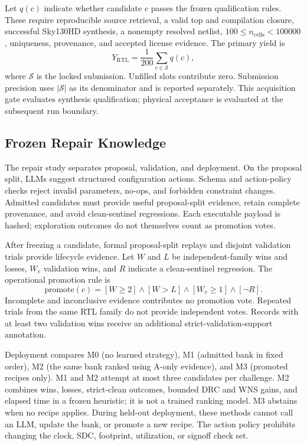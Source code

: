 Let $q(c)$ indicate whether candidate $c$ passes the frozen qualification rules. These require reproducible source retrieval, a valid top and compilation closure, successful Sky130HD synthesis, a nonempty resolved netlist, $100\leq n_{\mathrm{cells}}<100000$, uniqueness, provenance, and accepted license evidence. The primary yield is
\begin{equation}
Y_{\mathrm{RTL}}=\frac{1}{200}\sum_{c\in\mathcal{S}}q(c),
\end{equation}
where $\mathcal{S}$ is the locked submission. Unfilled slots contribute zero. Submission precision uses $|\mathcal{S}|$ as its denominator and is reported separately. This acquisition gate evaluates synthesis qualification; physical acceptance is evaluated at the subsequent run boundary.

\subsection{Frozen Repair Knowledge}
The repair study separates proposal, validation, and deployment. On the proposal split, LLMs suggest structured configuration actions. Schema and action-policy checks reject invalid parameters, no-ops, and forbidden constraint changes. Admitted candidates must provide useful proposal-split evidence, retain complete provenance, and avoid clean-sentinel regressions. Each executable payload is hashed; exploration outcomes do not themselves count as promotion votes.

After freezing a candidate, formal proposal-split replays and disjoint validation trials provide lifecycle evidence. Let $W$ and $L$ be independent-family wins and losses, $W_v$ validation wins, and $R$ indicate a clean-sentinel regression. The operational promotion rule is
\begin{equation}
\mathrm{promote}(c)=[W\geq2]\land[W>L]\land[W_v\geq1]\land[\neg R].
\end{equation}
Incomplete and inconclusive evidence contributes no promotion vote. Repeated trials from the same RTL family do not provide independent votes. Records with at least two validation wins receive an additional strict-validation-support annotation.

Deployment compares M0 (no learned strategy), M1 (admitted bank in fixed order), M2 (the same bank ranked using A-only evidence), and M3 (promoted recipes only). M1 and M2 attempt at most three candidates per challenge. M2 combines wins, losses, strict-clean outcomes, bounded DRC and WNS gains, and elapsed time in a frozen heuristic; it is not a trained ranking model. M3 abstains when no recipe applies. During held-out deployment, these methods cannot call an LLM, update the bank, or promote a new recipe. The action policy prohibits changing the clock, SDC, footprint, utilization, or signoff check set.

